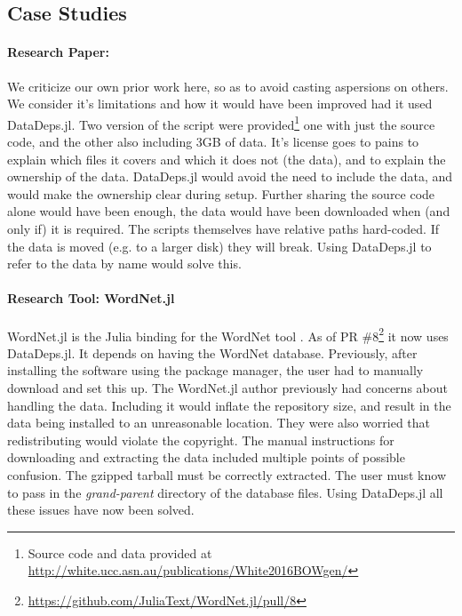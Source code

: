 \documentclass{book}
\begin{document}
\subsection{Case Studies}\label{sec:case-studies}
\paragraph{Research Paper: \citet{White2015BOWgen}}
We criticize our own prior work here, so as to avoid casting aspersions on others. We consider it's limitations and how it would have been improved had it used DataDeps.jl.
%
Two version of the script were provided\footnote{Source code and data provided at \url{http://white.ucc.asn.au/publications/White2016BOWgen/}}
one with just the source code, and the other also including 3GB of data.
It's license goes to pains to explain which files it covers and which it does not (the data), and to explain the ownership of the data.
DataDeps.jl would avoid the need to include the data, and would make the ownership clear during setup.
Further sharing the source code alone would have been enough, the data would have been downloaded when  (and only if) it is required.
%
The scripts themselves have relative paths hard-coded. If the data is moved (e.g. to a larger disk) they will break.
Using DataDeps.jl to refer to the data by name would solve this.


\paragraph{Research Tool: WordNet.jl}\label{sec:research-tool-wordnetjl}
WordNet.jl is the Julia binding for the WordNet tool \citep{miller1995wordnet}.
As of PR \#8\footnote{\url{https://github.com/JuliaText/WordNet.jl/pull/8}} it now uses DataDeps.jl.
It depends on having the WordNet database.
Previously, after installing the software using the package manager,
the user had to manually download and set this up.
%
The WordNet.jl author previously had concerns about handling the data.
Including it would inflate the repository size, and result in the data being installed to an unreasonable location.
They were also worried that redistributing would violate the copyright.
%
The manual instructions for downloading and extracting the data included multiple points of possible confusion.
The gzipped tarball must be correctly extracted.
The user must know to pass in the \emph{grand-parent} directory of the database files.
Using DataDeps.jl all these issues have now been solved.
\end{document}
